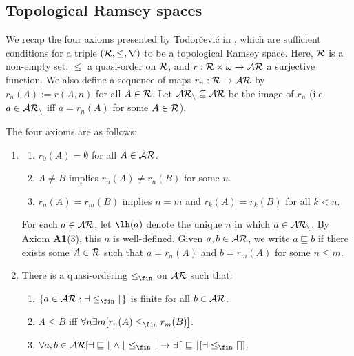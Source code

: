 \documentclass[11pt,reqno]{amsart}
\begin{document}
\subsection{Topological Ramsey spaces} 
We recap the four axioms presented by Todor\v{c}evi\'{c} in \cite{T10}, which are sufficient conditions for a triple $(\cal{R},\leq,r)$ to be a topological Ramsey space. Here, $\cal{R}$ is a non-empty set, $\leq$ a quasi-order on $\cal{R}$, and $r : \cal{R} \times \omega \to \cal{AR}$ a surjective function. We also define a sequence of maps $r_n : \cal{R} \to \cal{AR}$ by $r_n(A) := r(A,n)$ for all $A \in \cal{R}$. Let $\cal{AR}_n \subseteq \cal{AR}$ be the image of $r_n$ (i.e. $a \in \cal{AR}_n$ iff $a = r_n(A)$ for some $A \in \cal{R}$). 

The four axioms are as follows:
\begin{enumerate}
    \item[\textbf{(A1)}] 
    \begin{enumerate}[label=(\arabic*)]
        \item $r_0(A) = \emptyset$ for all $A \in \cal{AR}$.

        \item $A \neq B$ implies $r_n(A) \neq r_n(B)$ for some $n$.

        \item $r_n(A) = r_m(B)$ implies $n = m$ and $r_k(A) = r_k(B)$ for all $k < n$.
    \end{enumerate}
    For each $a \in \cal{AR}$, let $\lh(a)$ denote the unique $n$ in which $a \in \cal{AR}_n$. By Axiom \textbf{A1}(3), this $n$ is well-defined. Given $a,b \in \cal{AR}$, we write $a \sqsubseteq b$ if there exists some $A \in \cal{R}$ such that $a = r_n(A)$ and $b = r_m(A)$ for some $n \leq m$.

    \item[\textbf{(A2)}]  There is a quasi-ordering $\leq_\fin$ on $\cal{AR}$ such that:
    \begin{enumerate}[label=(\arabic*)]
        \item $\{a \in \cal{AR} : a \leq_\fin b\}$ is finite for all $b \in \cal{AR}$.

        \item $A \leq B$ iff $\forall n \exists m [r_n(A) \leq_\fin r_m(B)]$.

        \item $\forall a,b \in \cal{AR}[a \sqsubseteq b \wedge b \leq_\fin c \to \exists d \sqsubseteq c[a \leq_\fin d]]$.
    \end{enumerate}


\end{enumerate}
\end{document}
